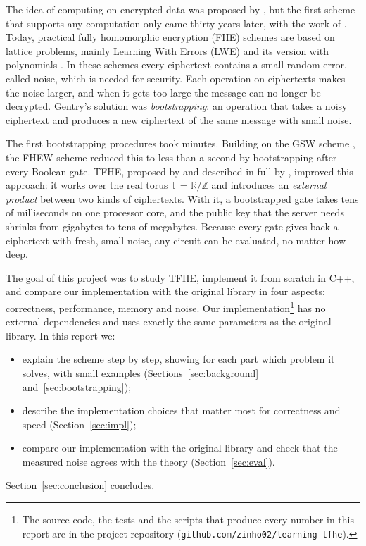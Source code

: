 \documentclass[12pt]{article}
\theoremstyle{plain}
\theoremstyle{definition}
\newcommand{\T}{\mathbb{T}}
\newcommand{\Z}{\mathbb{Z}}
\newcommand{\R}{\mathbb{R}}
\begin{document}
The idea of computing on encrypted data was proposed by
\cite{rivest1978databanks}, but the first scheme that supports any computation
only came thirty years later, with the work of \cite{gentry2009fhe}. Today,
practical fully homomorphic encryption (FHE) schemes are based on lattice
problems, mainly Learning With Errors (LWE) \cite{regev2005lwe} and its
version with polynomials \cite{lyubashevsky2010ringlwe}. In these schemes every
ciphertext contains a small random error, called noise, which is needed for
security. Each operation on ciphertexts makes the noise larger, and when it
gets too large the message can no longer be decrypted. Gentry's solution was
\emph{bootstrapping}: an operation that takes a noisy ciphertext and produces a
new ciphertext of the same message with small noise.

The first bootstrapping procedures took minutes. Building on the GSW scheme
\cite{gentry2013gsw}, the FHEW scheme \cite{ducas2015fhew} reduced this to
less than a second by bootstrapping after every Boolean gate. TFHE, proposed by
\cite{chillotti2016faster} and described in full by \cite{chillotti2020tfhe},
improved this approach: it works over the real torus $\T=\R/\Z$ and introduces an \emph{external product}
between two kinds of ciphertexts. With it, a bootstrapped gate takes tens of
milliseconds on one processor core, and the public key that the server needs
shrinks from gigabytes to tens of megabytes. Because every gate gives back a
ciphertext with fresh, small noise, any circuit can be evaluated, no matter how
deep.

The goal of this project was to study TFHE, implement it from scratch in C++,
and compare our implementation with the original library \cite{tfhelib} in
four aspects: correctness, performance, memory and noise. Our
implementation\footnote{The source code, the tests and the scripts that produce
every number in this report are in the project repository
(\texttt{github.com/zinho02/learning-tfhe}).} has no external dependencies and uses exactly the
same parameters as the original library. In this report we:
\begin{itemize}
  \item explain the scheme step by step, showing for each part which problem
        it solves, with small examples (Sections~\ref{sec:background}
        and~\ref{sec:bootstrapping});
  \item describe the implementation choices that matter most for correctness
        and speed (Section~\ref{sec:impl});
  \item compare our implementation with the original library and check that
        the measured noise agrees with the theory (Section~\ref{sec:eval}).
\end{itemize}
Section~\ref{sec:conclusion} concludes.
\end{document}
